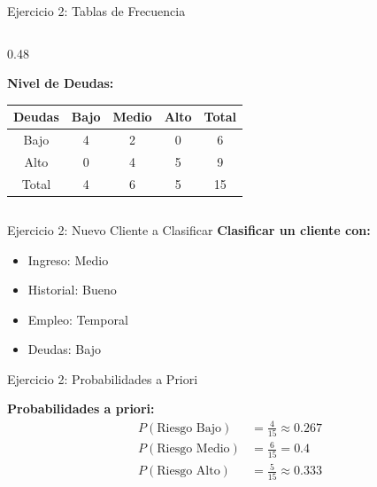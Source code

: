 \documentclass{beamer}
\begin{document}
\begin{frame}{Ejercicio 2: Tablas de Frecuencia}
\begin{columns}
\begin{column}{0.48\textwidth}
            \vspace{0.3cm}

            \textbf{Nivel de Deudas:}
            \begin{tabular}{ccccc}
                \toprule
                Deudas & Bajo & Medio & Alto & Total \\
                \midrule
                Bajo & 4 & 2 & 0 & 6 \\
                Alto & 0 & 4 & 5 & 9 \\
                \midrule
                Total & 4 & 6 & 5 & 15 \\
                \bottomrule
            \end{tabular}
        \end{column}
    \end{columns}
\end{frame}

\begin{frame}{Ejercicio 2: Nuevo Cliente a Clasificar}
    \textbf{Clasificar un cliente con:}

    \begin{itemize}
        \item Ingreso: Medio
        \item Historial: Bueno
        \item Empleo: Temporal
        \item Deudas: Bajo
    \end{itemize}
\end{frame}

\begin{frame}{Ejercicio 2: Probabilidades a Priori}
    \begin{center}
        \textbf{Probabilidades a priori:}
        \begin{align*}
        P(\text{Riesgo Bajo}) &= \frac{4}{15} \approx 0.267 \\
        P(\text{Riesgo Medio}) &= \frac{6}{15} = 0.4 \\
        P(\text{Riesgo Alto}) &= \frac{5}{15} \approx 0.333
        \end{align*}
    \end{center}
\end{frame}
\end{document}
